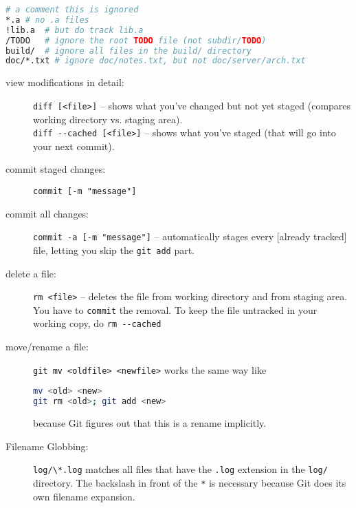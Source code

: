 \documentclass[a4paper,notumble]{leaflet} %
\begin{document}
\begin{lstlisting}[language=bash,frame=single,breaklines=true,breakautoindent=true,basicstyle=\ttfamily\small,fontadjust=true,prebreak={\mbox{$\hookleftarrow$}}]
# a comment this is ignored
*.a	# no .a files
!lib.a	# but do track lib.a
/TODO	# ignore the root TODO file (not subdir/TODO)
build/	# ignore all files in the build/ directory
doc/*.txt # ignore doc/notes.txt, but not doc/server/arch.txt
\end{lstlisting}
\begin{description}
\item[view modifications in detail:] \verb!diff [<file>]! -- shows what you’ve changed but not yet staged (compares working directory vs. staging area). \\
	\verb!diff --cached [<file>]! -- shows what you’ve staged (that will go into your next commit).
\item[commit staged changes:] \verb!commit [-m "message"]!
\item[commit all changes:] \verb!commit -a [-m "message"]! -- automatically stages every [already tracked] file, letting you skip the \verb!git add! part.
\item[delete a file:] \verb!rm <file>! -- deletes the file from working directory and from staging area. You have to \verb!commit! the removal. To keep the file untracked in your working copy, do \verb!rm --cached!
\item[move/rename a file:] \verb!git mv <oldfile> <newfile>! works the same way like 
\begin{lstlisting}[language=bash,breaklines=true,breakautoindent=false,basicstyle=\ttfamily\small,fontadjust=true]
mv <old> <new>
git rm <old>; git add <new>
\end{lstlisting}because Git figures out that this is a rename implicitly.
\item[Filename Globbing:] \verb!log/\*.log! matches all files that have the \verb!.log! extension in the \verb!log/! directory. The backslash in front of the \verb!*! is necessary because Git does its
own filename expansion.
\end{description}
\end{document}
